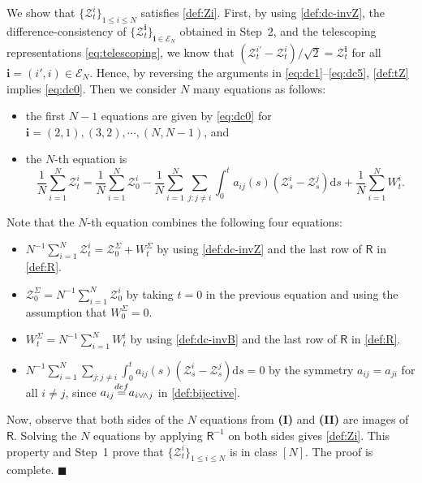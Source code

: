 \documentclass[12pt, twoside]{article}
\numberwithin{figure}{section}
\newcommand{\1}{\mathds 1}
\newcommand{\mc}{\mathcal}
\renewcommand{\d}{{\mathrm d}}
\newcommand{\2}{{\mathbf 1}}
\newcommand{\defeq}{{\stackrel{\rm def}{=}}}
\renewenvironment{proof}[1][\proofname]{\noindent {\bfseries #1.}\;}{\hfill\ensuremath{\blacksquare}\\}
\newcommand{\cc}{{^\circ}}
\newcommand{\bi}{\mathbf i}
\newcommand{\two}{{\sqrt{2}}}
\begin{document}
\begin{proof}[Proof of Proposition~\ref{prop:RM} (2$\cc$)]
We show that $\{\mc Z^i_t \}_{1\leq i\leq N}$ satisfies \eqref{def:Zi}. First, by using \eqref{def:dc-invZ}, the difference-consistency of $\{\mc Z^\bi_t \}_{\bi\in \mc E_N}$ obtained in Step~2, and the telescoping representations \eqref{eq:telescoping}, we know that $(\mc Z^{i\prime}_t-\mc Z^i_t)/\two=\mc Z_t^\bi$ for all $\bi=(i\prime,i)\in \mc E_N$. Hence, by reversing the arguments in \eqref{eq:dc1}--\eqref{eq:dc5}, \eqref{def:tZ} implies 
\eqref{eq:dc0}. Then we consider $N$ many equations as follows:
\begin{itemize}
\item [\bf (I)] the first $N-1$ equations are given by \eqref{eq:dc0} for $\bi=(2,1),(3,2),\cdots,(N,N-1)$, and
\item [\bf (II)] the $N$-th equation is 
\[
\frac{1}{N}\sum_{i=1}^N\mc Z^i_t=\frac{1}{N}\sum_{i=1}^N\mc Z^i_0-\frac{1}{N}\sum_{i=1}^N \sum_{j:j\neq i}\int_0^t a_{i j}(s)(\mc Z^i_s-\mc Z^j_s)\d s
+\frac{1}{N}\sum_{i=1}^N W^i_t.
\]
\end{itemize}
Note that the $N$-th equation combines the following four equations:
\begin{itemize}
\item  $N^{-1}\sum_{i=1}^N\mc Z^i_t= \mc Z^\Sigma_0+W^\Sigma_t$ by using
 \eqref{def:dc-invZ} and the last row of $\mathsf R$ in \eqref{def:R}. 
 \item $\mc Z^\Sigma_0=N^{-1}\sum_{i=1}^N \mc Z^i_0$ by taking $t=0$ in the previous equation and using the assumption that $W^\Sigma_0=0$.
 \item 
$W^\Sigma_t=N^{-1}\sum_{i=1}^N W^i_t$ by using \eqref{def:dc-invB} and the last row of $\mathsf R$ in \eqref{def:R}. 
\item $N^{-1}\sum_{i=1}^N \sum_{j:j\neq i}\int_0^t a_{i j}(s)(\mc Z^i_s-\mc Z^j_s)\d s=0$ by the symmetry $a_{ij}=a_{ji}$ for all $i\neq j$, since $a_{ij}\defeq a_{i\vee\!\wedge j}$ in \eqref{def:bijective}.
\end{itemize}

Now, observe that both sides of the $N$ equations from {\bf (I)} and {\bf (II)} are images of $\mathsf R$. Solving the $N$ equations by applying $\mathsf R^{-1}$ on both sides gives \eqref{def:Zi}. This property and Step~1 prove that $\{\mc Z^i_t\}_{1\leq i\leq N}$ is in class $[N]$. The proof is complete.
\end{proof}
\end{document}
